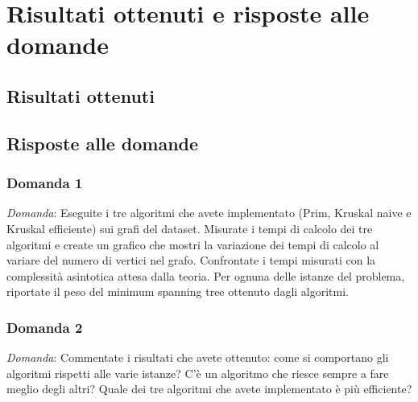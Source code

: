 \section{Risultati ottenuti e risposte alle domande}

\subsection{Risultati ottenuti}

\subsection{Risposte alle domande}

\subsubsection{Domanda 1}

\textit{Domanda}: Eseguite i tre algoritmi che avete implementato (Prim, Kruskal naive e Kruskal efficiente) sui grafi del dataset. Misurate i tempi di calcolo dei tre algoritmi e create un grafico che mostri la variazione dei tempi di calcolo al variare del numero di vertici nel grafo. Confrontate i tempi misurati con la complessità asintotica attesa dalla teoria. Per ognuna delle istanze del problema, riportate il peso del minimum spanning tree ottenuto dagli algoritmi.

\subsubsection{Domanda 2}
\textit{Domanda}: Commentate i risultati che avete ottenuto: come si comportano gli algoritmi rispetti alle varie istanze? C'è un algoritmo che riesce sempre a fare meglio degli altri? Quale dei tre algoritmi che avete implementato è più efficiente? 